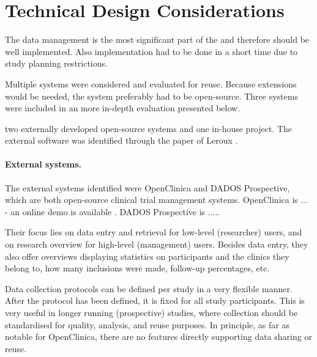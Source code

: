 \section{Technical Design Considerations}
\label{reuse}


The data management
is the most significant part of the \ivfsystem{} and therefore should be well implemented.
Also implementation had to be done in a short time due to study planning restrictions.

Multiple systems were considered and evaluated for reuse.
Because extensions would be needed, the system preferably had to be open-source.
Three systems were included in an more in-depth evaluation presented below.

two externally developed open-source systems and one in-house project.
The external software was identified through the paper of Leroux \cite{leroux2011}.

\paragraph{External systems.}
The external systems identified were OpenClinica and DADOS Prospective, 
which are both open-source clinical trial management systems.
OpenClinica \cite{} is ... - an online demo is available \cite{}.
DADOS Prospective \cite{} is .....

Their focus lies on data entry and retrieval for low-level (researcher) users, and on research overview for high-level (management) users.
Besides data entry, they also offer overviews displaying statistics on participants and the clinics they belong to, how many inclusions were made, follow-up percentages, etc.

Data collection protocols can be defined per study in a very flexible manner.
After the protocol has been defined, it is fixed for all study participants.
This is very useful in longer running (prospective) studies, where collection should be standardised for quality, analysis, and reuse purposes.
In principle, as far as notable for OpenClinica, there are no features directly supporting data sharing or reuse.

